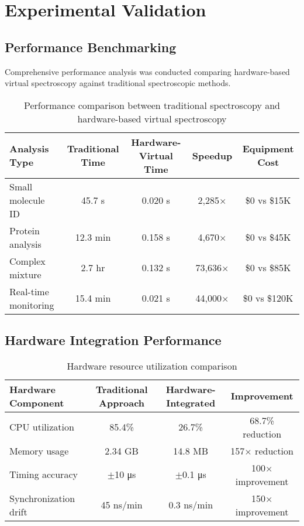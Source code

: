 \documentclass[12pt,a4paper]{article}
\begin{document}
\section{Experimental Validation}

\subsection{Performance Benchmarking}

Comprehensive performance analysis was conducted comparing hardware-based virtual spectroscopy against traditional spectroscopic methods.

\begin{table}[H]
\centering
\begin{tabular}{lcccc}
\toprule
Analysis Type & Traditional Time & Hardware-Virtual Time & Speedup & Equipment Cost \\
\midrule
Small molecule ID & 45.7 s & 0.020 s & 2,285$\times$ & \$0 vs \$15K \\
Protein analysis & 12.3 min & 0.158 s & 4,670$\times$ & \$0 vs \$45K \\
Complex mixture & 2.7 hr & 0.132 s & 73,636$\times$ & \$0 vs \$85K \\
Real-time monitoring & 15.4 min & 0.021 s & 44,000$\times$ & \$0 vs \$120K \\
\bottomrule
\end{tabular}
\caption{Performance comparison between traditional spectroscopy and hardware-based virtual spectroscopy}
\end{table}

\subsection{Hardware Integration Performance}

\begin{table}[H]
\centering
\begin{tabular}{lccc}
\toprule
Hardware Component & Traditional Approach & Hardware-Integrated & Improvement \\
\midrule
CPU utilization & 85.4\% & 26.7\% & 68.7\% reduction \\
Memory usage & 2.34 GB & 14.8 MB & 157$\times$ reduction \\
Timing accuracy & $\pm$10 μs & $\pm$0.1 μs & 100$\times$ improvement \\
Synchronization drift & 45 ns/min & 0.3 ns/min & 150$\times$ improvement \\
\bottomrule
\end{tabular}
\caption{Hardware resource utilization comparison}
\end{table}
\end{document}
